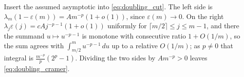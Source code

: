 Insert the assumed asymptotic into \eqref{eq:doubling_cut}. The left side is
$\lambda_m(1-\varepsilon(m))=Am^{-p}(1+o(1))$, since $\varepsilon(m)\rightarrow0$. On the
right $\lambda_j\varepsilon(j)=cAj^{-p-1}(1+o(1))$ uniformly for
$\lceil m/2\rceil\leq j\leq m-1$, and there the summand $u\mapsto u^{-p-1}$ is monotone with
consecutive ratio $1+O(1/m)$, so the sum agrees with $\int_{m/2}^{m}u^{-p-1}\,du$ up to a
relative $O(1/m)$; as $p\neq0$ that integral is $\frac{m^{-p}}{p}\left(2^{p}-1\right)$.
Dividing the two sides by $Am^{-p}>0$ leaves \eqref{eq:doubling_cramer}.
